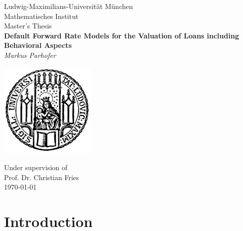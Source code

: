 \documentclass[12pt]{article}
\begin{document}
	\begin{titlepage}
		
		
		
		\begin{center}
			\normalsize{Ludwig-Maximilians-Universität München \\
				Mathematisches Institut}\\[15ex]
			
			\LARGE{Master's Thesis}\\[1.2ex]	
			\LARGE{\textbf{Default Forward Rate Models for the Valuation of Loans including Behavioral Aspects}} \\[2.5ex]
			\Large{\textit{Markus Parhofer}}\\[9ex]
		\end{center}
		
		
		\begin{center}
			\includegraphics[width=1.8in]{siegel}\\[13ex]
		\end{center}
		
		\begin{center}
			\normalsize{}
			Under supervision of\\
			Prof. Dr. Christian Fries\\
			\today\
			\\
		\end{center}
		
	
	
	
\end{titlepage}

\tableofcontents
\thispagestyle{empty}
\clearpage


	
	
	
	
	
	
	
	\section{Introduction}
\end{document}

